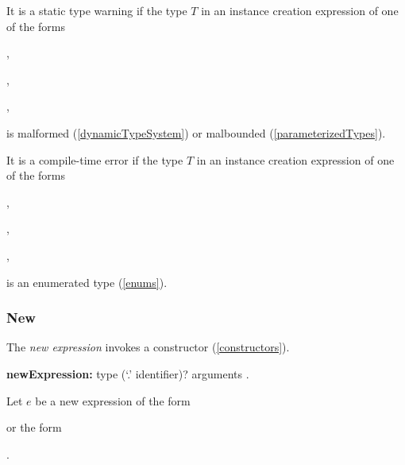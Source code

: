 \documentclass{article}
\begin{document}
\LMHash{}
It is a static type warning if
the type $T$ in an instance creation expression of one of the forms

,

,

,

is malformed (\ref{dynamicTypeSystem}) or malbounded (\ref{parameterizedTypes}).

\LMHash{}
It is a compile-time error if the type $T$ in an instance creation expression of one of the forms

,

,

,


is an enumerated type (\ref{enums}).


\subsubsection{New}

\LMHash{}
The {\em new expression} invokes a constructor (\ref{constructors}).

\begin{grammar}
{\bf newExpression:}\NEW{} type (`{\escapegrammar .}' identifier)? arguments
  .
\end{grammar}

\LMHash{}
Let $e$ be a new expression of the form

or the form

.
\end{document}
